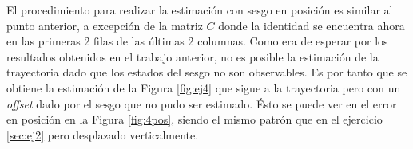
	El procedimiento para realizar la estimación con sesgo en posición es similar al punto anterior, a excepción de la matriz $C$ donde la identidad se encuentra ahora en las primeras 2 filas de las últimas 2 columnas. Como era de esperar por los resultados obtenidos en el trabajo anterior, no es posible la estimación de la trayectoria dado que los estados del sesgo no son observables. Es por tanto que se obtiene la estimación de la Figura \ref{fig:ej4} que sigue a la trayectoria pero con un \emph{offset} dado por el sesgo que no pudo ser estimado. Ésto se puede ver en el error en posición en la Figura \ref{fig:4pos}, siendo el mismo patrón que en el ejercicio \ref{sec:ej2} pero desplazado verticalmente.

